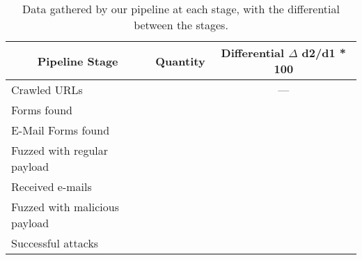 \begin{table*}[tbp]
	\centering
	\normalsize
	\begin{tabular}{|l|c|c|}
		\hline
		\multicolumn{1}{|c|}{\textbf{Pipeline Stage}} &
		\multicolumn{1}{p{3cm}|}{\centering \textbf{Quantity}} &
		\multicolumn{1}{p{2.8cm}|}{\centering \textbf{Differential}
		$\Delta$ d2/d1 * 100}\\
		\hline
		Crawled URLs  & \urls &  --- \\
		\hline
		Forms found  & \forms & \formsDelta \\
		\hline
		E-Mail Forms found  & \emailforms & \emailformsDelta \\
		\hline
		Fuzzed with regular payload  & \fuzzed & \fuzzedDelta \\
		\hline
		Received e-mails  & \recd & \recdDelta \\
		\hline
		Fuzzed with malicious payload  & \malfuzzed & \malfuzzedDelta \\
		\hline
		Successful attacks  & \success & \successDelta \\
		\hline

	\end{tabular}
	\caption[]{Data gathered by our pipeline at each stage, with the differential between the stages.}
	\label{tab:pipeline}
\end{table*}
